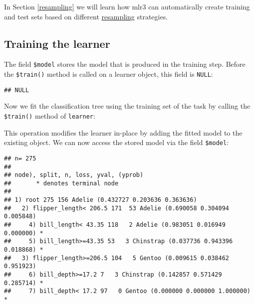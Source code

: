 \documentclass[
]{scrbook}
\newenvironment{Shaded}{\begin{snugshade}}{\end{snugshade}}
\newcommand{\AttributeTok}[1]{\textcolor[rgb]{0.77,0.63,0.00}{#1}}
\newcommand{\FunctionTok}[1]{\textcolor[rgb]{0.00,0.00,0.00}{#1}}
\newcommand{\NormalTok}[1]{#1}
\newcommand{\SpecialCharTok}[1]{\textcolor[rgb]{0.00,0.00,0.00}{#1}}
\renewenvironment{Shaded} {\begin{snugshade}\small} {\end{snugshade}}
\begin{document}
In Section \ref{resampling} we will learn how mlr3 can automatically create training and test sets based on different \protect\hyperlink{resampling}{resampling} strategies.

\hypertarget{training}{%
\subsection{Training the learner}\label{training}}

The field \texttt{\$model} stores the model that is produced in the training step.
Before the \texttt{\$train()} method is called on a learner object, this field is \texttt{NULL}:

\begin{Shaded}
\end{Shaded}

\begin{verbatim}
## NULL
\end{verbatim}

Now we fit the classification tree using the training set of the task by calling the \texttt{\$train()} method of \texttt{learner}:

\begin{Shaded}
\end{Shaded}

This operation modifies the learner in-place by adding the fitted model to the existing object.
We can now access the stored model via the field \texttt{\$model}:

\begin{Shaded}
\end{Shaded}

\begin{verbatim}
## n= 275 
## 
## node), split, n, loss, yval, (yprob)
##       * denotes terminal node
## 
## 1) root 275 156 Adelie (0.432727 0.203636 0.363636)  
##   2) flipper_length< 206.5 171  53 Adelie (0.690058 0.304094 0.005848)  
##     4) bill_length< 43.35 118   2 Adelie (0.983051 0.016949 0.000000) *
##     5) bill_length>=43.35 53   3 Chinstrap (0.037736 0.943396 0.018868) *
##   3) flipper_length>=206.5 104   5 Gentoo (0.009615 0.038462 0.951923)  
##     6) bill_depth>=17.2 7   3 Chinstrap (0.142857 0.571429 0.285714) *
##     7) bill_depth< 17.2 97   0 Gentoo (0.000000 0.000000 1.000000) *
\end{verbatim}
\end{document}
